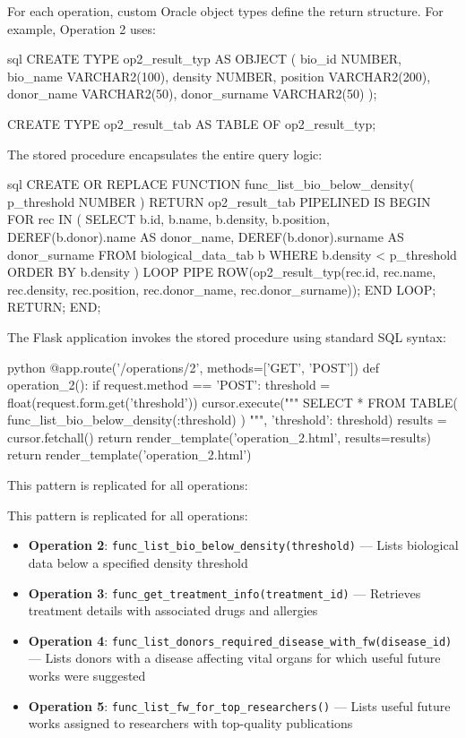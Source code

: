 \documentclass[11pt,a4paper]{article}
\begin{document}
For each operation, custom Oracle object types define the return structure. For example, Operation 2 uses:
\begin{sqlbox}{sql}
CREATE TYPE op2_result_typ AS OBJECT (
    bio_id NUMBER,
    bio_name VARCHAR2(100),
    density NUMBER,
    position VARCHAR2(200),
    donor_name VARCHAR2(50),
    donor_surname VARCHAR2(50)
);

CREATE TYPE op2_result_tab AS TABLE OF op2_result_typ;
\end{sqlbox}

The stored procedure encapsulates the entire query logic:
\begin{sqlbox}{sql}
CREATE OR REPLACE FUNCTION func_list_bio_below_density(
    p_threshold NUMBER
) RETURN op2_result_tab PIPELINED IS
BEGIN
    FOR rec IN (
        SELECT b.id, b.name, b.density, b.position,
               DEREF(b.donor).name AS donor_name,
               DEREF(b.donor).surname AS donor_surname
        FROM biological_data_tab b
        WHERE b.density < p_threshold
        ORDER BY b.density
    ) LOOP
        PIPE ROW(op2_result_typ(rec.id, rec.name, 
                 rec.density, rec.position,
                 rec.donor_name, rec.donor_surname));
    END LOOP;
    RETURN;
END;
\end{sqlbox}

The Flask application invokes the stored procedure using standard SQL syntax:
\begin{sqlbox}{python}
@app.route('/operations/2', methods=['GET', 'POST'])
def operation_2():
    if request.method == 'POST':
        threshold = float(request.form.get('threshold'))
        cursor.execute("""
            SELECT * FROM TABLE(
                func_list_bio_below_density(:threshold)
            )
        """, {'threshold': threshold})
        results = cursor.fetchall()
        return render_template('operation_2.html', 
                             results=results)
    return render_template('operation_2.html')
\end{sqlbox}

This pattern is replicated for all operations:

This pattern is replicated for all operations:
\begin{itemize}
    \item \textbf{Operation 2}: \texttt{func\_list\_bio\_below\_density(threshold)} — Lists biological data below a specified density threshold
    \item \textbf{Operation 3}: \texttt{func\_get\_treatment\_info(treatment\_id)} — Retrieves treatment details with associated drugs and allergies
    \item \textbf{Operation 4}: \texttt{func\_list\_donors\_required\_disease\_with\_fw(disease\_id)} — Lists donors with a disease affecting vital organs for which useful future works were suggested
    \item \textbf{Operation 5}: \texttt{func\_list\_fw\_for\_top\_researchers()} — Lists useful future works assigned to researchers with top-quality publications
\end{itemize}
\end{document}
